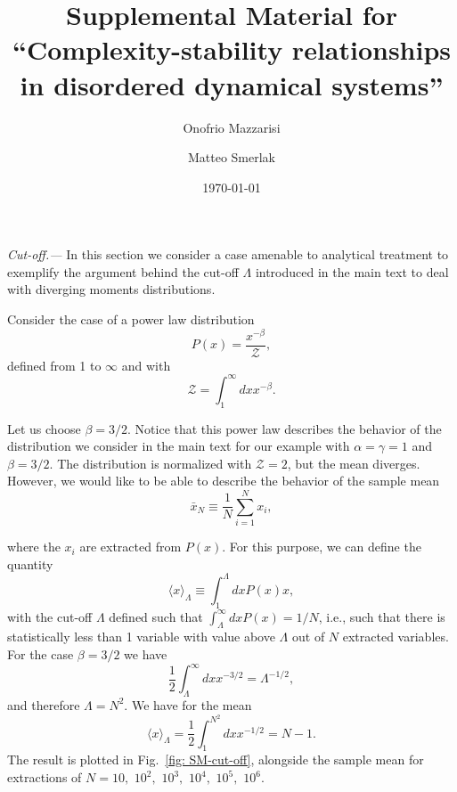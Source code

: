 \documentclass[aps,prl,superscriptaddress,twocolumn]{revtex4}
\begin{document}
\title{\Large Supplemental Material for ``Complexity-stability relationships in disordered dynamical systems''}

\author{Onofrio Mazzarisi}

\author{Matteo Smerlak}


\date{\today}


\maketitle

{\it Cut-off.---} In this section we consider a case amenable to analytical treatment to exemplify the argument behind the cut-off $\Lambda$ introduced in the main text to deal with diverging moments distributions.

Consider the case of a power law distribution 
\begin{equation}
  P(x)=\frac{x^{-\beta}}{\mathcal{Z}} ,
\end{equation}
defined from 1 to $\infty$ and with 
\begin{equation}
  \mathcal{Z}=\int_1^{\infty}dxx^{-\beta}.  
\end{equation}

Let us choose $\beta=3/2$. Notice that this power law describes the behavior of the distribution we consider in the main text for our example with $\alpha=\gamma=1$ and $\beta=3/2$.
The distribution is normalized with $\mathcal{Z}=2$, but the mean diverges. However, we would like to be able to describe the behavior of the sample mean 
\begin{equation}
  \bar{x}_N\equiv\frac{1}{N}\sum_{i=1}^Nx_i,
\end{equation}

where the $x_i$ are extracted from $P(x)$.
For this purpose, we can define the quantity
\begin{equation}
  \langle x\rangle_{\Lambda}\equiv\int_1^{\Lambda}dxP(x)x,
\end{equation}
with the cut-off $\Lambda$ defined such that $\int_{\Lambda}^{\infty}dxP(x)=1/N$, i.e., such that there is statistically less than 1 variable with value above $\Lambda$ out of $N$ extracted variables. For the case $\beta=3/2$ we have 
\begin{equation}
  \frac{1}{2}\int_{\Lambda}^{\infty}dxx^{-3/2}=\Lambda^{-1/2},
\end{equation}
and therefore $\Lambda=N^2$. We have for the mean
\begin{equation}
  \langle x\rangle_{\Lambda}=\frac{1}{2}\int_1^{N^2}dxx^{-1/2} = N-1.
\end{equation}
The result is plotted in Fig.~\ref{fig: SM-cut-off}, alongside the sample mean for extractions of $N=10,$ $10^2,$ $10^3,$ $10^4,$ $10^5,$ $10^6$.
\end{document}
